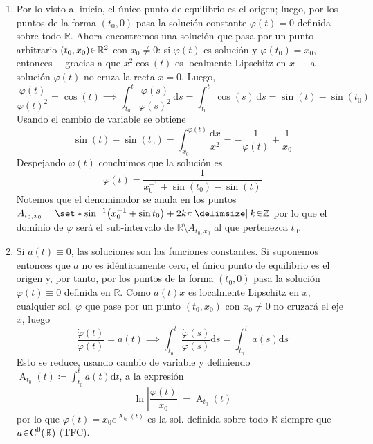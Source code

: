 \begin{sol}
\begin{enumerate}[label = (\alph*)]
    \item Por lo visto al inicio, el único punto de equilibrio es el origen; luego, por los puntos de la forma 
    $(t_0,0)$ pasa la solución constante $\varphi(t) = 0$ definida sobre todo 
    $\mathbb{R}$. Ahora encontremos una solución que pasa por un punto arbitrario 
    $(t_0,x_0) \en \mathbb{R}^2$ con $x_0 \neq 0$: si $\varphi(t)$ es solución y 
    $\varphi(t_0) = x_0$, entonces ---gracias a que $x^2 \cos(t)$ es localmente 
    Lipschitz en $x$--- la solución $\varphi(t)$ no cruza la recta $x=0$. Luego,
    \[
        \frac{\dot{\varphi}(t)}{\varphi(t)^2}%
        = \cos(t)%
        \implies%
        \int^t_{t_0} \frac{\dot\varphi(s)}{\varphi(s)^2}\,\mathrm{d}s 
        = \int^t_{t_0} \cos(s)\,\mathrm{d}s%
        = \sin(t) - \sin(t_0)
    \]
    Usando el cambio de variable se obtiene
    \[
        \sin(t) - \sin(t_0)%
        = \int^{\varphi(t)}_{x_0} \frac{\mathrm{d}x}{x^2}%
        = -\frac{1}{\varphi(t)} + \frac{1}{x_0}
    \]
    Despejando $\varphi(t)$ concluimos que la solución es
    \[
        \varphi(t) = \frac{1}{x_0^{-1} + \sin(t_0) - \sin(t)}
    \]
    Notemos que el denominador se anula en los puntos $A_{t_0,x_0} = \set*{\sin^{-1}\!\big(x_0^{-1} + \sin t_0\big) + 2k\pi \given k \en \mathbb{Z}}$ por lo que el dominio de $
    \varphi$ será el sub-intervalo de $\mathbb{R} \setminus A_{t_0,x_0}$ al que pertenezca $t_0$.

    \item Si $a(t) \equiv 0$, las soluciones son las funciones constantes. Si suponemos entonces que $a$ no es idénticamente cero, el único punto de equilibrio es el origen y, por tanto, por los puntos de la forma $(t_0, 0)$ pasa la solución $\varphi(t) \equiv 0$ definida en $\mathbb{R}$. Como $a(t)x$ es localmente Lipschitz en $x$, cualquier sol. $\varphi$ que pase por un punto $(t_0, x_0)$ con $x_0 \neq 0$ no cruzará el eje $x$, luego
    \[
        \frac{\dot\varphi(t)}{\varphi(t)} = a(t)%
        \implies%
        \int^{t}_{t_0}\frac{\dot\varphi(s)}{\varphi(s)}\mathrm{d}s = \int^{t}_{t_0} a(s)\mathrm{d}s
    \]
    Esto se reduce, usando cambio de variable y definiendo $\operatorname{A}_{t_0}(t) \coloneq \int^{t}_{t_0} a(t)\mathrm{d}t$, a la expresión
    \[
        \ln\left|%
            \frac{\varphi(t)}{x_0}
        \right|%
        = \operatorname{A}_{t_0}(t)
    \]
    por lo que $\varphi(t) = x_0 e^{\operatorname{A}_{t_0}(t)}$ es la sol. definida sobre todo $\mathbb{R}$ siempre que $a \en \operatorname{C}^0(\mathbb{R})$ (TFC).\qedhere
\end{enumerate}
\end{sol}




